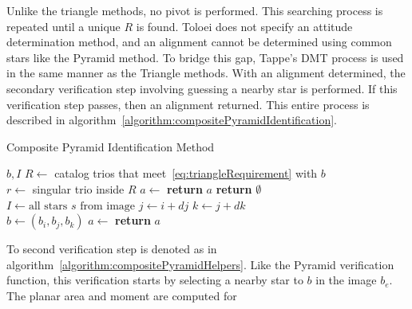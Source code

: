 Unlike the triangle methods, no pivot is performed. This searching process is repeated until a unique $R$ is found.
Toloei does not specify an attitude determination method, and an alignment cannot be determined using common
stars like the Pyramid method. To bridge this gap, Tappe's DMT process is used in the same manner as the Triangle
methods. With an alignment determined, the secondary verification step involving guessing a nearby star is performed.
If this verification step passes, then an alignment returned. This entire process is described in
algorithm~\autoref{algorithm:compositePyramidIdentification}.

\begin{algorithm}
    \caption{Composite Pyramid Identification Method} \label{algorithm:compositePyramidIdentification}
    \begin{algorithmic}[1]
         {$b, I$}
        \State $R \gets $ catalog trios that meet~\eqref{eq:triangleRequirement} with $b$
        \\
        \State $r \gets $ singular trio inside $R$
        \State $a \gets $ 
        \State \textbf{return} $a$
        \EndIf
        \EndIf
        \State \textbf{return } $\emptyset$
        \EndFunction
        \\
        \State $I \gets \text{all stars } s \text{ from image}$
        \State $j \gets i + dj$
        \State $k \gets j + dk$
        \\
        \State $b \gets (b_i, b_j, b_k)$
        \State $a \gets$ 
        \State \textbf{return} $a$
        \EndIf
        \EndFor
        \EndFor
        \EndFor
        \EndProcedure
    \end{algorithmic}
\end{algorithm}

To second verification step is denoted as  in
algorithm~\autoref{algorithm:compositePyramidHelpers}. Like the Pyramid verification function, this verification starts
by selecting a nearby star to $b$ in the image $b_e$. The planar area and moment are computed for

